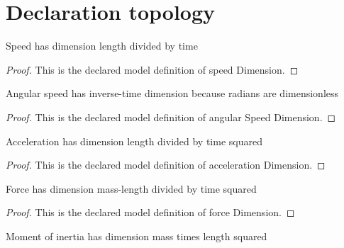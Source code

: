\section{Declaration topology}
\begin{definition}
  \label{def:physics:phyx-mini-0786:phyxminiproblems-problemphyxmini0786-speeddimension}
  Speed has dimension length divided by time
\end{definition}
\begin{proof}
  This is the declared model definition of speed Dimension.
\end{proof}
\begin{definition}
  \label{def:physics:phyx-mini-0786:phyxminiproblems-problemphyxmini0786-angularspeeddimension}
  Angular speed has inverse-time dimension because radians are dimensionless
\end{definition}
\begin{proof}
  This is the declared model definition of angular Speed Dimension.
\end{proof}
\begin{definition}
  \label{def:physics:phyx-mini-0786:phyxminiproblems-problemphyxmini0786-accelerationdimension}
  Acceleration has dimension length divided by time squared
\end{definition}
\begin{proof}
  This is the declared model definition of acceleration Dimension.
\end{proof}
\begin{definition}
  \label{def:physics:phyx-mini-0786:phyxminiproblems-problemphyxmini0786-forcedimension}
  Force has dimension mass-length divided by time squared
\end{definition}
\begin{proof}
  This is the declared model definition of force Dimension.
\end{proof}
\begin{definition}
  \label{def:physics:phyx-mini-0786:phyxminiproblems-problemphyxmini0786-momentofinertiadimension}
  Moment of inertia has dimension mass times length squared
\end{definition}
